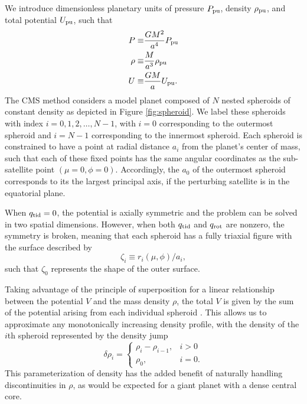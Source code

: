 We introduce dimensionless planetary units of pressure $P_{\rm pu}$, density
$\rho_{\rm pu}$, and total potential $U_{\rm pu}$, such that
%
\begin{equation} \begin{aligned} P \equiv& \frac{GM^2}{a^4} P_{\rm pu} \\ \rho
        \equiv& \frac{M}{a^3} \rho_{\rm pu} \\ U \equiv& \frac{GM}{a} U_{\rm pu}. \\
    \end{aligned} \label{eq:planetary_units} \end{equation}
%
The CMS method considers a model planet composed of $N$ nested spheroids of constant
density as depicted in Figure \ref{fig:spheroid}. We label these spheroids with index
$i=0,1,2,\dots,N-1$, with $i = 0$ corresponding to the outermost spheroid and $i=N-1$
corresponding to the innermost spheroid. Each spheroid is constrained to have a point
at radial distance $a_i$ from the planet's center of mass, such that each of these
fixed points has the same angular coordinates as the sub-satellite point
$(\mu=0,\phi=0)$.  Accordingly, the $a_0$ of the outermost spheroid corresponds to
its the largest principal axis, if the perturbing satellite is in the equatorial
plane.

When $q_{\rm tid}=0$, the potential is axially symmetric and the problem can be
solved in two spatial dimensions. However, when both $q_{\rm tid}$ and $q_{\rm rot}$
are nonzero, the symmetry is broken, meaning that each spheroid has a fully triaxial
figure with the surface described by
%
\begin{equation} \zeta_i \equiv r_i(\mu,\phi) / a_i, \label{eq:shape} \end{equation}
%
such that $\zeta_0$ represents the shape of the outer surface.

Taking advantage of the principle of superposition for a linear relationship between
the potential $V$ and the mass density $\rho$, the total $V$ is given by the sum of
the potential arising from each individual spheroid \citep{hubbard2013}. This allows us to
approximate any monotonically increasing density profile, with the density of the
$i$th spheroid represented by the density jump
%
\begin{equation} \delta \rho_i = \begin{cases} \rho_i - \rho_{i-1}, & i>0 \\ \rho_0,
        & i=0.  \end{cases} \label{eq:density_increment} \end{equation}
%
This parameterization of density has the added benefit of naturally handling
discontinuities in $\rho$, as would be expected for a giant planet with a dense
central core.

